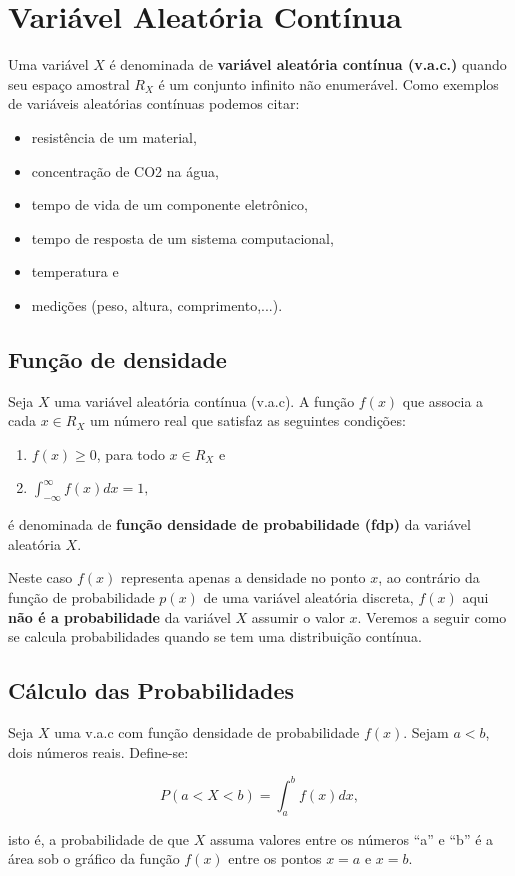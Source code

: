 \documentclass[12pt]{article}   %
\begin{document}
	
	\tableofcontents
	
	\section{Variável Aleatória Contínua}
	
	Uma variável $X$ é denominada de \textbf{variável aleatória contínua (v.a.c.)} quando seu espaço amostral $R_{X}$ é um conjunto infinito não enumerável. Como exemplos de variáveis aleatórias contínuas podemos citar:
	
	\begin{itemize}
		\item resistência de um material,
		\item concentração de CO2 na água,
		\item tempo de vida de um componente eletrônico,
		\item tempo de resposta de um sistema computacional,
		\item temperatura e
		\item medições (peso, altura, comprimento,...).

	\end{itemize}
	
	\subsection{Função de densidade}
	
	Seja $X$ uma variável aleatória contínua (v.a.c). A função $f(x)$ que associa a cada $x \in R_{X}$ um número real que satisfaz as seguintes condições:
	
	\begin{enumerate}
		\item $f(x) \geq 0$, para todo $x \in R_{X}$ e
		
		\item $\displaystyle\int_{-\infty}^{\infty} f(x)dx = 1,$
	\end{enumerate}
	
	\noindent é denominada de \textbf{função densidade de probabilidade (fdp)} da variável aleatória $X$.
	\par Neste caso $f(x)$ representa apenas a densidade no ponto $x$, ao contrário da função de probabilidade $p(x)$ de uma variável aleatória discreta, $f(x)$ aqui \textbf{não é a probabilidade} da variável $X$ assumir o valor $x$. Veremos a seguir como se calcula probabilidades quando se tem uma distribuição contínua.
	
	\subsection{Cálculo das Probabilidades}
	
	Seja $X$ uma v.a.c com função densidade de probabilidade $f(x)$. Sejam $a < b$, dois números reais. Define-se:
	
	\[ P(a < X < b) = \int_{a}^{b} f(x)dx,\]
	
	\noindent isto é, a probabilidade de que $X$ assuma valores entre os números \enquote{a} e \enquote{b} é a área sob o gráfico da função $f(x)$ entre os pontos $x = a$ e $x = b$.
	
\end{document}
